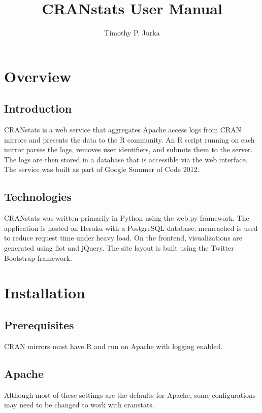 \documentclass[12pt, titlepage]{article}
\begin{document}
\title{CRANstats User Manual}
\author{Timothy P. Jurka}

\maketitle

\section{Overview}

\subsection{Introduction}
CRANstats is a web service that aggregates Apache access logs from CRAN mirrors and presents the data to the R community. An R script running on each mirror parses the logs, removes user identifiers, and submits them to the server. The logs are then stored in a database that is accessible via the web interface. The service was built as part of Google Summer of Code 2012.

\subsection{Technologies}
CRANstats was written primarily in Python using the web.py framework. The application is hosted on Heroku with a PostgreSQL database. memcached is used to reduce request time under heavy load. On the frontend, visualizations are generated using flot and jQuery. The site layout is built using the Twitter Bootstrap framework.


\section{Installation}

\subsection{Prerequisites}
CRAN mirrors must have R and run on Apache with logging enabled.

\subsection{Apache}
Although most of these settings are the defaults for Apache, some configurations may need to be changed to work with cranstats.
\end{document}
